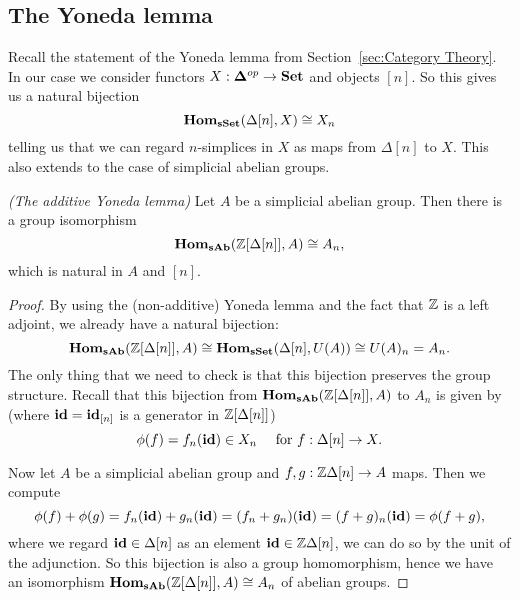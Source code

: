 \subsection{The Yoneda lemma}
Recall the statement of the Yoneda lemma from Section~\ref{sec:Category Theory}. In our case we consider functors $X: \mathbf{\Delta}^{op} \to \mathbf{Set}$ and objects $[n]$. So this gives us a natural bijection
$$ \mathbf{Hom}_{\mathbf{sSet}}(\Delta[n], X) \cong X_n $$
telling us that we can regard $n$-simplices in $X$ as maps from $\Delta[n]$ to $X$. This also extends to the case of simplicial abelian groups.
\begin{lemma}\emph{(The additive Yoneda lemma)}
	\label{le:yoneda_add}
	Let $A$ be a simplicial abelian group. Then there is a group isomorphism
	$$ \mathbf{Hom}_{\mathbf{sAb}}(\mathbb{Z}[\Delta[n]], A) \cong A_n, $$
	which is natural in $A$ and $[n]$.
\end{lemma}
\begin{proof}
	By using the (non-additive) Yoneda lemma and the fact that $\mathbb{Z}$ is a left adjoint, we already have a natural bijection:
	$$ \mathbf{Hom}_{\mathbf{sAb}}(\mathbb{Z}[\Delta[n]], A) \cong \mathbf{Hom}_{\mathbf{sSet}}(\Delta[n], U(A)) \cong U(A)_n = A_n. $$
	The only thing that we need to check is that this bijection preserves the group structure. Recall that this bijection from $\mathbf{Hom}_{\mathbf{sAb}}(\mathbb{Z}[\Delta[n]], A)$ to $A_n$ is given by (where $\mathbf{id} = \mathbf{id}_{[n]}$ is a generator in $\mathbb{Z}[\Delta[n]]$)
	$$ \phi(f) = f_n(\mathbf{id}) \in X_n \quad\text{ for } f: \Delta[n] \to X. $$

	Now let $A$ be a simplicial abelian group and $f, g: \mathbb{Z}\Delta[n] \to A$ maps. Then we compute
	$$ \phi(f) + \phi(g) = f_n(\mathbf{id}) + g_n(\mathbf{id}) = (f_n + g_n)(\mathbf{id}) = (f+g)_n(\mathbf{id}) = \phi(f+g), $$
	where we regard $\mathbf{id} \in \Delta[n]$ as an element $\mathbf{id} \in \mathbb{Z}\Delta[n]$, we can do so by the unit of the adjunction. So this bijection is also a group homomorphism, hence we have an isomorphism $\mathbf{Hom}_{\mathbf{sAb}}(\mathbb{Z}[\Delta[n]], A) \cong A_n$ of abelian groups.
\end{proof}
